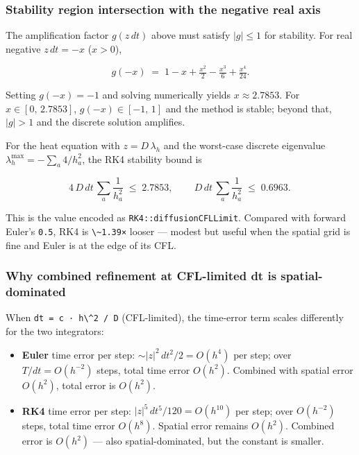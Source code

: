 \subsubsection{Stability region intersection with the negative real
axis}\label{stability-region-intersection-with-the-negative-real-axis}

The amplification factor \(g(z\,dt)\) above must satisfy \(|g| \le 1\)
for stability. For real negative \(z\,dt = -x\) (\(x > 0\)),

\[
g(-x) \;=\; 1 - x + \tfrac{x^2}{2} - \tfrac{x^3}{6} + \tfrac{x^4}{24}.
\]

Setting \(g(-x) = -1\) and solving numerically yields
\(x \approx 2.7853\). For \(x \in [0,\,2.7853]\), \(g(-x) \in [-1,\,1]\)
and the method is stable; beyond that, \(|g| > 1\) and the discrete
solution amplifies.

For the heat equation with \(z = D\,\lambda_h\) and the worst-case
discrete eigenvalue \(\lambda_h^{\max} = -\sum_a 4/h_a^2\), the RK4
stability bound is

\[
4\,D\,dt\,\sum_a \frac{1}{h_a^2} \;\le\; 2.7853, \qquad
\boxed{\,D\,dt\,\sum_a \frac{1}{h_a^2} \;\le\; 0.6963.\,}
\]

This is the value encoded as
\passthrough{\lstinline!RK4::diffusionCFLLimit!}. Compared with forward
Euler's \passthrough{\lstinline!0.5!}, RK4 is
\passthrough{\lstinline!\~1.39×!} looser --- modest but useful when the
spatial grid is fine and Euler is at the edge of its CFL.

\subsubsection{Why combined refinement at CFL-limited dt is
spatial-dominated}\label{why-combined-refinement-at-cfl-limited-dt-is-spatial-dominated}

When \passthrough{\lstinline!dt = c · h\^2 / D!} (CFL-limited), the
time-error term scales differently for the two integrators:

\begin{itemize}
\tightlist
\item
  \textbf{Euler} time error per step: \(\sim |z|^2\,dt^2 / 2 = O(h^4)\)
  per step; over \(T/dt = O(h^{-2})\) steps, total time error
  \(O(h^2)\). Combined with spatial error \(O(h^2)\), total error is
  \textbf{\(O(h^2)\)}.
\item
  \textbf{RK4} time error per step: \(|z|^5\,dt^5 / 120 = O(h^{10})\)
  per step; over \(O(h^{-2})\) steps, total time error \(O(h^8)\).
  Spatial error remains \(O(h^2)\). Combined error is
  \textbf{\(O(h^2)\)} --- also spatial-dominated, but the constant is
  smaller.
\end{itemize}

